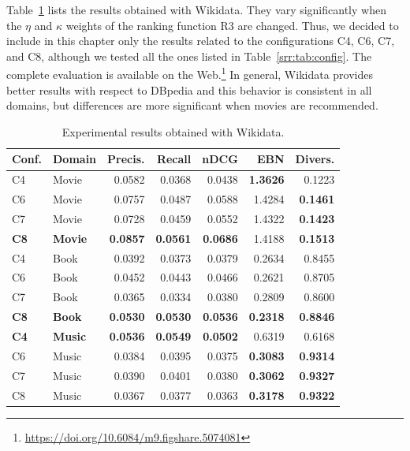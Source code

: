 Table~\ref{srr:tab:ex1-wd} lists the results obtained with Wikidata. They vary significantly when the $\eta$ and $\kappa$ weights of the ranking function R3 are changed. Thus, we decided to include in this chapter only the results related to the configurations C4, C6, C7, and C8, although we tested all the ones listed in Table~\ref{srr:tab:config}. The complete evaluation is available on the Web.\footnote{\url{https://doi.org/10.6084/m9.figshare.5074081}} In general, Wikidata provides better results with respect to DBpedia and this behavior is consistent in all domains, but differences are more significant when movies are recommended.

\begin{table}
\centering
\begin{tabular}{@{}llrrrrr@{}}
\toprule
Conf. & Domain  & Precis. & Recall & nDCG   & EBN    & Divers. \\ \midrule
C4    & Movie   & 0.0582  & 0.0368 & 0.0438 & \textbf{1.3626} & 0.1223 \\
C6    & Movie   & 0.0757  & 0.0487 & 0.0588 & 1.4284 & \textbf{0.1461} \\
C7    & Movie   & 0.0728  & 0.0459 & 0.0552 & 1.4322 & \textbf{0.1423} \\
\textbf{C8} & \textbf{Movie} & \textbf{0.0857} & \textbf{0.0561} & \textbf{0.0686} & 1.4188 & \textbf{0.1513} \\
\midrule
C4    & Book   & 0.0392   & 0.0373 & 0.0379 & 0.2634 & 0.8455  \\
C6    & Book   & 0.0452   & 0.0443 & 0.0466 & 0.2621 & 0.8705  \\
C7    & Book   & 0.0365   & 0.0334 & 0.0380 & 0.2809 & 0.8600  \\
\textbf{C8} & \textbf{Book}  & \textbf{0.0530} & \textbf{0.0530} & \textbf{0.0536} & \textbf{0.2318} & \textbf{0.8846} \\
\midrule
\textbf{C4} & \textbf{Music} & \textbf{0.0536} & \textbf{0.0549} & \textbf{0.0502} & 0.6319 & 0.6168 \\
C6    & Music  & 0.0384   & 0.0395 & 0.0375 & \textbf{0.3083} & \textbf{0.9314} \\
C7    & Music  & 0.0390   & 0.0401 & 0.0380 & \textbf{0.3062} & \textbf{0.9327} \\
C8    & Music  & 0.0367   & 0.0377 & 0.0363 & \textbf{0.3178} & \textbf{0.9322} \\ \bottomrule
\end{tabular}
\caption[Experimental results with Wikidata]{Experimental results obtained with Wikidata.}
\label{srr:tab:ex1-wd}
\end{table}

